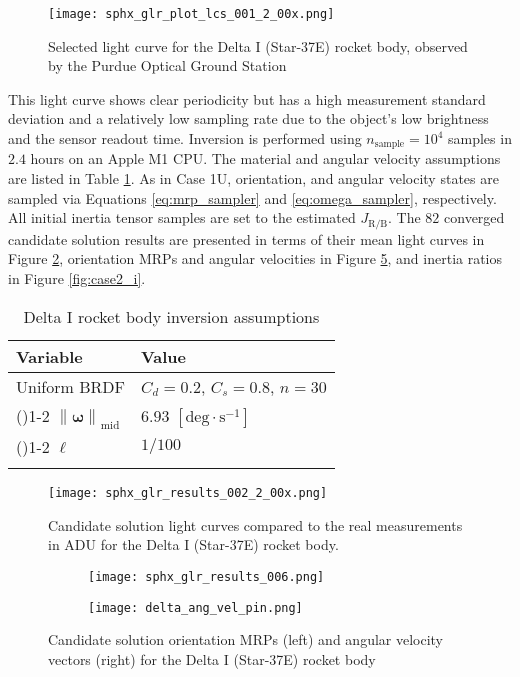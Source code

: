 \documentclass[a4paper,twocolumn]{spaceDebrisC} %
\newcommand{\grule}[0]{\arrayrulecolor{darkgray}\cmidrule(){1-2}}
\newcommand{\brule}[0]{\arrayrulecolor{black} \bottomrule}
\newcommand{\vctr}[1]{\bm{#1}}
\newcommand{\norm}[1]{\left\lVert#1\right\rVert}
\newcommand{\figmed}[0]{0.35\textwidth}
\begin{document}
\begin{figure}[H]
  \centering
  \texttt{[image: sphx\_glr\_plot\_lcs\_001\_2\_00x.png]}
  \caption{Selected light curve for the Delta I (Star-37E) rocket body, observed by the Purdue Optical Ground Station}
  \label{fig:rb_lc_obs}
\end{figure}

This light curve shows clear periodicity but has a high measurement standard deviation and a relatively low sampling rate due to the object's low brightness and the sensor readout time. Inversion is performed using $n_\text{sample}=10^4$ samples in $2.4$ hours on an Apple M1 CPU. The material and angular velocity assumptions are listed in Table \ref{tb:case2_ass}. As in Case 1U, orientation, and angular velocity states are sampled via Equations \ref{eq:mrp_sampler} and \ref{eq:omega_sampler}, respectively. All initial inertia tensor samples are set to the estimated $J_\text{R/B}$. The $82$ converged candidate solution results are presented in terms of their mean light curves in Figure \ref{fig:case2_s}, orientation MRPs and angular velocities in Figure \ref{fig:case2_pw}, and inertia ratios in Figure \ref{fig:case2_i}.

\begin{table}[H]
  \centering
  \renewcommand{\arraystretch}{1.2} 
  \caption{Delta I rocket body inversion assumptions}
  \vspace*{6pt}
  \begin{tabular}{@{} l l @{}}
    \toprule
 Variable & Value \\ \midrule
 Uniform BRDF & $C_d=0.2$, $C_s=0.8$, $n=30$ \\ \grule
    $\norm{\vctr{\omega}}_\text{mid}$ & $6.93$ $[\text{deg} \cdot \text{s}^{-1}]$ \\ \grule
    $\ell$ & $1/100$ \\ \brule
  \end{tabular}
  \label{tb:case2_ass}
\end{table}

\begin{figure}[H]
  \centering
  \texttt{[image: sphx\_glr\_results\_002\_2\_00x.png]}
  \caption{Candidate solution light curves compared to the real measurements in ADU for the Delta I (Star-37E) rocket body.}
  \label{fig:case2_s}
\end{figure}

\begin{figure}[H]
  \centering
  \begin{subfigure}[t]{0.23\textwidth}
    \centering
    \texttt{[image: sphx\_glr\_results\_006.png]}
    \caption{}
    \label{fig:case2_pwa}
  \end{subfigure}
  \hfill
  \begin{subfigure}[t]{0.23\textwidth}
    \centering
    \texttt{[image: delta\_ang\_vel\_pin.png]}
    \caption{}
    \label{fig:case2_pwb}
  \end{subfigure}

  \caption{Candidate solution orientation MRPs (left) and angular velocity vectors (right) for the Delta I (Star-37E) rocket body}
  \label{fig:case2_pw}
\end{figure}
\end{document}
